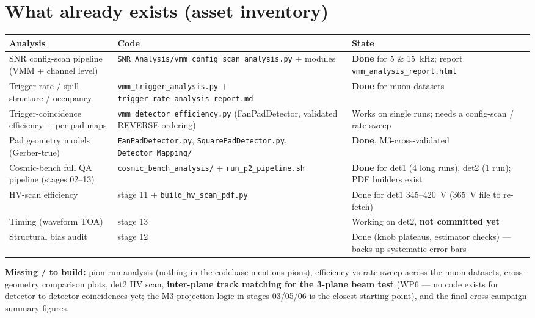 \documentclass[11pt,a4paper]{article}
\newcommand{\code}[1]{\texttt{#1}}
\begin{document}
\section{What already exists (asset inventory)}

\begin{table}[h!]
\centering\small
\begin{tabular}{L{5.2cm} L{5.6cm} L{4.4cm}}
\toprule
\textbf{Analysis} & \textbf{Code} & \textbf{State} \\
\midrule
SNR config-scan pipeline (VMM + channel level) &
  \code{SNR\_Analysis/vmm\_config\_scan\_analysis.py} + modules &
  \textbf{Done} for 5 \& 15~kHz; report \code{vmm\_analysis\_report.html} \\
\addlinespace
Trigger rate / spill structure / occupancy &
  \code{vmm\_trigger\_analysis.py} + \code{trigger\_rate\_analysis\_report.md} &
  \textbf{Done} for muon datasets \\
\addlinespace
Trigger-coincidence efficiency + per-pad maps &
  \code{vmm\_detector\_efficiency.py} (FanPadDetector, validated REVERSE ordering) &
  Works on single runs; needs a config-scan / rate sweep \\
\addlinespace
Pad geometry models (Gerber-true) &
  \code{FanPadDetector.py}, \code{SquarePadDetector.py}, \code{Detector\_Mapping/} &
  \textbf{Done}, M3-cross-validated \\
\addlinespace
Cosmic-bench full QA pipeline (stages 02--13) &
  \code{cosmic\_bench\_analysis/} + \code{run\_p2\_pipeline.sh} &
  \textbf{Done} for det1 (4 long runs), det2 (1 run); PDF builders exist \\
\addlinespace
HV-scan efficiency &
  stage 11 + \code{build\_hv\_scan\_pdf.py} &
  Done for det1 345--420~V (365~V file to re-fetch) \\
\addlinespace
Timing (waveform TOA) &
  stage 13 &
  Working on det2, \textbf{not committed yet} \\
\addlinespace
Structural bias audit &
  stage 12 &
  Done (knob plateaus, estimator checks) --- backs up systematic error bars \\
\bottomrule
\end{tabular}
\end{table}

\textbf{Missing / to build:} pion-run analysis (nothing in the codebase
mentions pions), efficiency-vs-rate sweep across the muon datasets,
cross-geometry comparison plots, det2 HV scan, \textbf{inter-plane track
matching for the 3-plane beam test} (WP6 --- no code exists for
detector-to-detector coincidences yet; the M3-projection logic in stages
03/05/06 is the closest starting point), and the final cross-campaign summary
figures.
\end{document}
